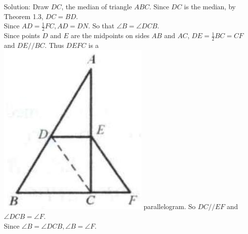 \documentclass{article}
\begin{document}
Solution:
Draw \(D C\), the median of triangle \(A B C\). Since \(D C\) is the median, by Theorem 1.3, \(D C=B D\).\\
Since \(A D=\frac{1}{2} F C, A D=D N\). So that \(\angle B=\angle D C B\).\\
Since points \(D\) and \(E\) are the midpoints on sides \(A B\) and \(A C\), \(D E=\frac{1}{2} B C=C F\) and \(D E / / B C\). Thus \(D E F C\) is a\\
\includegraphics[width=\textwidth]{images/012.jpg} parallelogram. So \(D C / / E F\) and \(\angle D C B=\angle F\).\\
Since \(\angle B=\angle D C B, \angle B=\angle F\).
\end{document}
